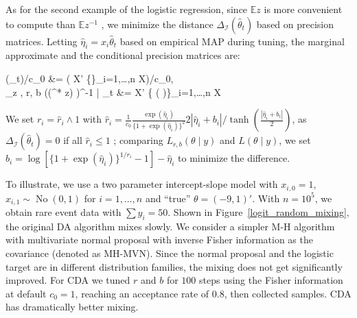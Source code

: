 \documentclass[10pt]{article}
\newcommand{\be}{\begin{equs}}
\newcommand{\ee}{\end{equs}}
\newcommand{\bb}[1]{\mathbb{#1}}
\newcommand{\mc}[1]{\mathcal{#1}}
\DeclareMathOperator{\No}{No}
\DeclareMathOperator{\var}{var}
\DeclareMathOperator{\diag}{diag}
\begin{document}
 
 As for the second example of the logistic regression, since $\bb E z$ is more convenient to compute than $\bb E z^{-1}$ , we minimize the distance $\Delta_{\mc I}(\hat\theta_t)$ based on precision matrices. Letting $\hat\eta_i = x_i \hat\theta_t$ based on empirical MAP during tuning, the marginal approximate and the conditional precision matrices are:

 \be
 \mc I(\hat \theta_t)/c_0 &= ( X' \diag\bigg\{\bigg\}_{i=1,\ldots ,n} X)/c_0, \\
  \bb  E_{z \mid \theta, r, b}  \big (\var (\theta^* \mid z) \big)^{-1} \bigg| \hat\theta_t &=  X'  \diag\bigg\{ \tanh\Big( \Big)\bigg\}_{i=1,\ldots ,n} X
\ee

We set $r_i=\hat r_i \wedge 1$ with $\hat r_i= \frac{1}{c_0}\frac{\exp(\hat\eta_i )}{ \{1+\exp(\hat\eta_i )\} ^2} {2 |\hat\eta_i +b_i|}/ \tanh(\frac{|\hat\eta_i +b_i|}{2})$, as $\Delta_{\mc I}(\hat\theta_t)=0$ if all $\hat r_i \le1$ ; comparing $L_{r,b}(\theta \mid y )$ and $L(\theta \mid y )$, we set $b_i = \log[  \{1+\exp(\hat\eta_i)\}^{1/r_i} -1] - \hat\eta_i$ to minimize the difference.

To illustrate, we use a two parameter intercept-slope model with $x_{i,0}=1$,  $x_{i,1}\sim \No(0,1)$ for $i=1,\ldots, n$ and ``true'' $\theta=(-9,1)'$. With $n= 10^5$, we obtain rare event data with  $\sum y_{i} = 50 $.  Shown in Figure~\ref{logit_random_mixing}, the original DA algorithm  \citep{polson2013bayesian} mixes slowly. We consider a simpler M-H algorithm with multivariate normal proposal with inverse Fisher information as the covariance (denoted as MH-MVN). Since the normal proposal and the logistic target are in different distribution families, the mixing does not get significantly improved. For CDA we tuned $r$ and $b$ for $100$ steps using the Fisher information at default $c_0=1$, reaching an acceptance rate of $0.8$, then collected samples. CDA has dramatically better mixing.
\end{document}
